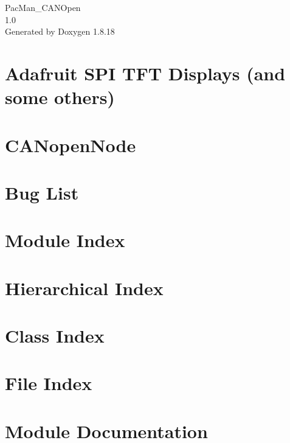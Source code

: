 \let\mypdfximage\pdfximage\def\pdfximage{\immediate\mypdfximage}\documentclass[twoside]{book}
\newcommand{\+}{\discretionary{\mbox{\scriptsize$\hookleftarrow$}}{}{}}
\newcommand{\clearemptydoublepage}{%
  \newpage{\pagestyle{empty}\cleardoublepage}%
}
\begin{document}
\hypersetup{pageanchor=false,
             bookmarksnumbered=true,
             pdfencoding=unicode
            }
\begin{titlepage}
\vspace*{7cm}
\begin{center}%
{\Large Pac\+Man\+\_\+\+C\+A\+N\+Open \\[1ex]\large 1.\+0 }\\
\vspace*{1cm}
{\large Generated by Doxygen 1.8.18}\\
\end{center}
\end{titlepage}
\clearemptydoublepage
{}
\tableofcontents
\clearemptydoublepage
{}
\hypersetup{pageanchor=true}

\chapter{Adafruit S\+PI T\+FT Displays (and some others)}
\label{index}\hypertarget{index}{}
\chapter{C\+A\+Nopen\+Node}
\label{md__r_e_a_d_m_e}

\chapter{Bug List}
\label{bug}

\chapter{Module Index}

\chapter{Hierarchical Index}

\chapter{Class Index}

\chapter{File Index}

\chapter{Module Documentation}



















\end{document}
